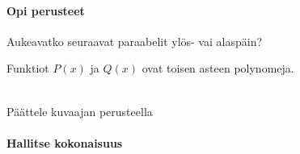 \begin{tehtavasivu}

\paragraph*{Opi perusteet}

\begin{tehtava}
  Aukeavatko seuraavat paraabelit ylös- vai alaspäin?
  \begin{alakohdat}
  \end{alakohdat}

  \begin{vastaus}
    \begin{alakohdat}
    \end{alakohdat}
  \end{vastaus}
\end{tehtava}

\begin{tehtava}
Funktiot $P(x)$ ja $Q(x)$ ovat toisen asteen polynomeja.\\
\begin{kuvaajapohja}{1}{-2}{3}{-1}{3}
\end{kuvaajapohja} \\
Päättele kuvaajan perusteella
\begin{alakohdat}
\end{alakohdat}

\begin{vastaus}
\begin{alakohdat}
\end{alakohdat}
\end{vastaus}
\end{tehtava}

\paragraph*{Hallitse kokonaisuus}


\end{tehtavasivu}
